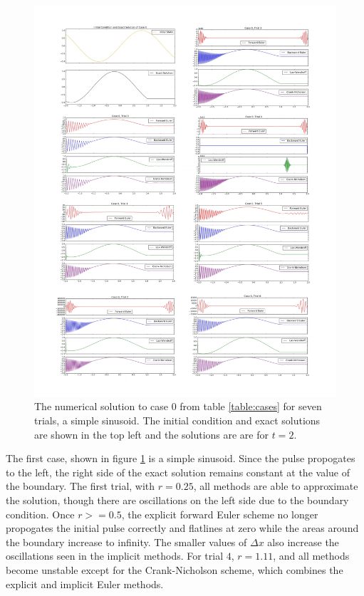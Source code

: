 \documentclass[twocolumn]{article}
\begin{document}
\begin{figure}[t]
  \centering
  \includegraphics[width=\textwidth]{case0}
  \caption{
    The numerical solution to case $0$ from table \ref{table:cases}
    for seven trials, a simple sinusoid. The initial condition and
    exact solutions are shown in the top left and the solutions are
    are for $t=2$.
  }
  \label{fig:case0}
\end{figure}

The first case, shown in figure \ref{fig:case0} is a simple
sinusoid. Since the pulse propogates to the left, the right side of
the exact solution remains constant at the value of the boundary. The
first trial, with $r = 0.25$, all methods are able to approximate the
solution, though there are oscillations on the left side due to the
boundary condition. Once $r >= 0.5$, the explicit forward Euler scheme
no longer propogates the initial pulse correctly and flatlines at zero
while the areas around the boundary increase to infinity. The smaller
values of $\Delta x$ also increase the oscillations seen in the
implicit methods. For trial $4$, $r = 1.11$, and all methods become
unstable except for the Crank-Nicholson scheme, which combines the
explicit and implicit Euler methods.
\end{document}
